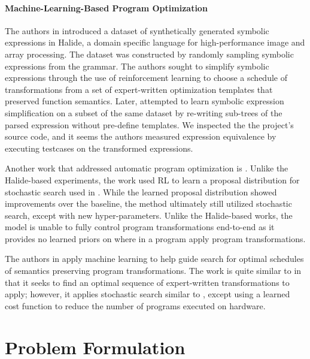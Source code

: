 \documentclass{article}
\begin{document}
\paragraph{Machine-Learning-Based Program Optimization} The authors in \cite{chen2019learning} introduced a dataset of synthetically generated symbolic expressions in Halide, a domain specific language for high-performance image and array processing. The dataset was constructed by randomly sampling symbolic expressions from the grammar. The authors sought to simplify symbolic expressions through the use of reinforcement learning to choose a schedule of transformations from a set of expert-written optimization templates that preserved function semantics. Later, \cite{shi2020} attempted to learn symbolic expression simplification on a subset of the same dataset by re-writing sub-trees of the parsed expression without pre-define templates. We inspected the the project's source code, and it seems the authors measured expression equivalence by executing testcases on the transformed expressions. 

Another work that addressed automatic program optimization is \cite{bunel2016learning}. Unlike the Halide-based experiments, the work used RL to learn a proposal distribution for stochastic search used in \cite{schkufza2013stochastic}. While the learned proposal distribution showed improvements over the baseline, the method ultimately still utilized stochastic search, except with new hyper-parameters. Unlike the Halide-based works, the model is unable to fully control program transformations end-to-end as it provides no learned priors on where in a program  apply program transformations.

The authors in \cite{chen2018learning} apply machine learning to help guide search for optimal schedules of semantics preserving program transformations. The work is quite similar to \cite{chen2019learning} in that it seeks to find an optimal sequence of expert-written transformations to apply; however, it applies stochastic search similar to \cite{schkufza2013stochastic}, except using a learned cost function to reduce the number of programs executed on hardware. 

\section{Problem Formulation}
\end{document}
